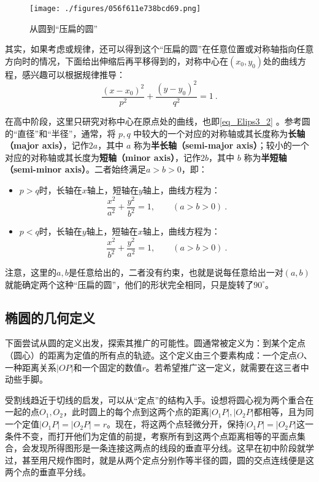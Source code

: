 \begin{figure}[ht]
\centering
\texttt{[image: ./figures/056f611e738bcd69.png]}
\caption{从圆到“压扁的圆”} \label{fig_Elips3_1}
\end{figure}

其实，如果考虑或规律，还可以得到这个“压扁的圆”在任意位置或对称轴指向任意方向时的情况，下面给出伸缩后再平移得到的，对称中心在$(x_0,y_0)$处的曲线方程，感兴趣可以根据规律推导：
\begin{equation}
\frac{(x-x_0)^2}{p^2} + \frac{(y-y_0)^2}{q^2} = 1~.
\end{equation}

在高中阶段，这里只研究对称中心在原点处的曲线，也即\autoref{eq_Elips3_2} 。参考圆的“直径”和“半径”，通常，将 $p, q$ 中较大的一个对应的对称轴或其长度称为\textbf{长轴（major axis）}，记作$2a$，其中 $a$ 称为\textbf{半长轴（semi-major axis）}；较小的一个对应的对称轴或其长度为\textbf{短轴（minor axis）}，记作$2b$，其中 $b$ 称为\textbf{半短轴（semi-minor axis）}。二者始终满足$a>b>0$，即：
\begin{itemize}
\item $p>q$时，长轴在$x$轴上，短轴在$y$轴上，曲线方程为：
\begin{equation}\label{eq_Elips3_5}
\frac{x^2}{a^2} + \frac{y^2}{b^2} = 1,\qquad(a>b>0)~.
\end{equation}
\item $p<q$时，长轴在$y$轴上，短轴在$x$轴上，曲线方程为：
\begin{equation}\label{eq_Elips3_7}
\frac{x^2}{b^2} + \frac{y^2}{a^2} = 1,\qquad(a>b>0)~.
\end{equation}
\end{itemize}

注意，这里的$a,b$是任意给出的，二者没有约束，也就是说每任意给出一对$(a,b)$就能确定两个这种“压扁的圆”，他们的形状完全相同，只是旋转了$90^\circ$。

\subsection{椭圆的几何定义}\label{sub_Elips3_2}

下面尝试从圆的定义出发，探索其推广的可能性。圆通常被定义为：到某个定点（圆心）的距离为定值的所有点的轨迹。这个定义由三个要素构成：一个定点$O$、一种距离关系$|OP|$和一个固定的数值$r$。若希望推广这一定义，就需要在这三者中动些手脚。

受割线趋近于切线的启发，可以从“定点”的结构入手。设想将圆心视为两个重合在一起的点$O_1,O_2$，此时圆上的每个点到这两个点的距离$|O_1P|,|O_2P|$都相等，且为同一个定值$|O_1P|=|O_2P|=r$。现在，将这两个点轻微分开，保持$|O_1P|=|O_2P|$这一条件不变，而打开他们为定值的前提，考察所有到这两个点距离相等的平面点集合，会发现所得图形是一条连接这两点的线段的垂直平分线。这早在初中阶段就学过，甚至用尺规作图时，就是从两个定点分别作等半径的圆，圆的交点连线便是这两个点的垂直平分线。

